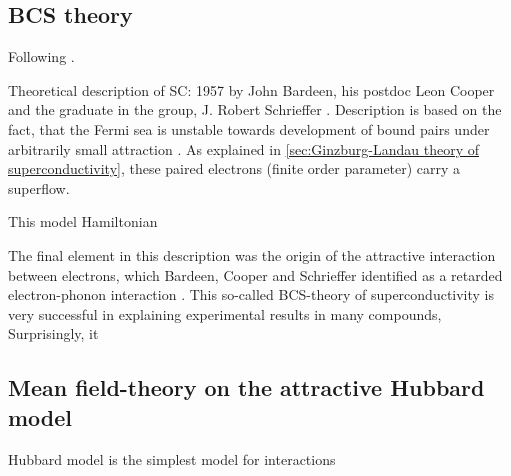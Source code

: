 \documentclass[../notes.tex]{subfiles}
\begin{document}
\subsection{BCS theory}

Following \cite[ch. 14]{colemanIntroductionManyBodyPhysics2015}.

Theoretical description of SC: 1957 by John Bardeen, his postdoc Leon Cooper and the graduate in the group, J. Robert Schrieffer \cite{bardeenTheorySuperconductivity1957}.
Description is based on the fact, that the Fermi sea is unstable towards development of bound pairs under arbitrarily small attraction \cite{cooperBoundElectronPairs1956}.
As explained in \cref{sec:Ginzburg-Landau theory of superconductivity}, these paired electrons (finite order parameter) carry a superflow.

This model Hamiltonian

The final element in this description was the origin of the attractive interaction between electrons, which Bardeen, Cooper and Schrieffer identified as a retarded electron-phonon interaction \cite{bardeenTheorySuperconductivity1957}.
This so-called BCS-theory of superconductivity is very successful in explaining experimental results in many compounds, 
Surprisingly, it




\subsection{Mean field-theory on the attractive Hubbard model}

Hubbard model is the simplest model for interactions

\cite{qinHubbardModelComputational2022}
\end{document}
